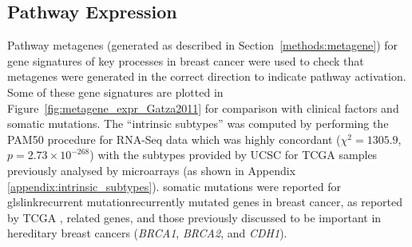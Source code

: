 \subsection{Pathway Expression} \label{chapt3:metagene_expression}

Pathway \glspl{metagene} (generated as described in Section~\ref{methods:metagene}) for gene signatures of key processes in breast cancer \citep{Gatza2011} were used to check that \glspl{metagene} were generated in the correct direction to indicate pathway activation. Some of these gene signatures are plotted in Figure~\ref{fig:metagene_expr_Gatza2011} for comparison with clinical factors and \gls{somatic} \glspl{mutation}. The ``\glspl{intrinsic subtype}''  was computed by performing the \gls{PAM50} procedure \cite{Parker2009} for \gls{RNA-Seq} data which was highly concordant ($\chi^2 = 1305.9$, $p = 2.73 \times 10^{-268}$) with the subtypes provided by \gls{UCSC} \citep{UCSC2012} for \gls{TCGA} samples  \citep{TCGA2012} previously analysed by \glspl{microarray} (as shown in Appendix \ref{appendix:intrinsic_subtypes}). \Gls{somatic} \glspl{mutation} were reported for glslink{recurrent mutation}{recurrently mutated} genes in breast cancer, as reported by \gls{TCGA} \citep{TCGA2012}, related genes, and those previously discussed to be important in \gls{hereditary} breast cancers (\textit{BRCA1}, \textit{BRCA2}, and \textit{CDH1}).

